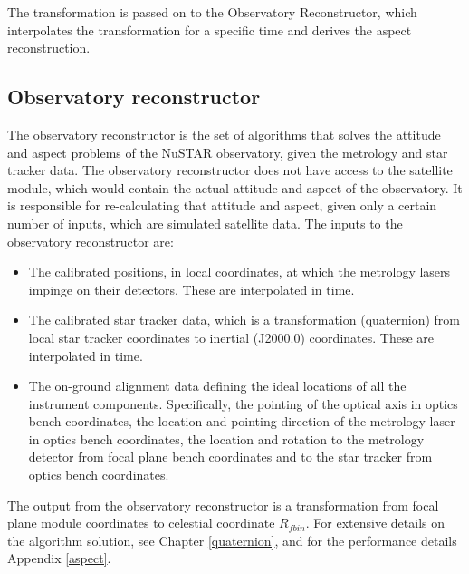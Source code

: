  The transformation is passed on to the Observatory Reconstructor, which interpolates the transformation for a specific time and derives the aspect reconstruction.

\subsection{Observatory reconstructor}
The observatory reconstructor is the set of algorithms that solves the attitude and aspect problems of the NuSTAR observatory, given the metrology and star tracker data. The observatory reconstructor does not have access to the satellite module, which would contain the actual attitude and aspect of the observatory. It is responsible for re-calculating that attitude and aspect, given only a certain number of inputs, which are simulated satellite data.
The inputs to the observatory reconstructor are:
\begin{itemize}
\item The calibrated positions, in local coordinates, at which the metrology lasers impinge on their detectors. These are interpolated in time.
\item The calibrated star tracker data, which is a transformation (quaternion) from local star tracker coordinates to inertial (J2000.0) coordinates. These are interpolated in time. 
\item The on-ground alignment data defining the ideal locations of all the instrument components. Specifically, the pointing of the optical axis in optics bench coordinates, the location and pointing direction of the metrology laser in optics bench coordinates, the location and rotation to the metrology detector from focal plane bench coordinates and to the star tracker from optics bench coordinates.
\end{itemize}
The output from the observatory reconstructor is a transformation from focal plane module coordinates to celestial coordinate $R_{fbin}$.
For extensive details on the algorithm solution, see Chapter \ref{quaternion}, and for the performance details Appendix \ref{aspect}.
